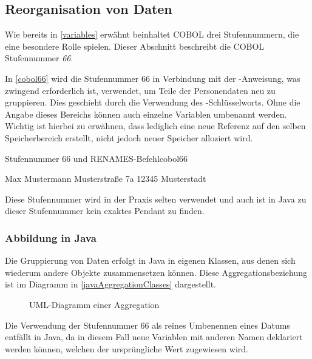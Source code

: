 \subsection{Reorganisation von Daten}
Wie bereits in \autoref{variables} erwähnt beinhaltet COBOL drei Stufennummern, die eine besondere Rolle spielen. Dieser Abschnitt beschreibt die COBOL Stufennummer \textit{66}.

In \autoref{cobol66} wird die Stufennummer 66 in Verbindung mit der -Anweisung, was zwingend erforderlich ist, verwendet, um Teile der Personendaten neu zu gruppieren. Dies geschieht durch die Verwendung des -Schlüsselworts. Ohne die Angabe dieses Bereichs können auch einzelne Variablen umbenannt werden. Wichtig ist hierbei zu erwähnen, dass lediglich eine neue Referenz auf den selben Speicherbereich erstellt, nicht jedoch neuer Speicher alloziert wird.

\begin{codeWithCaption}{Stufennummer 66 und RENAMES-Befehl}{cobol66}
\begin{shellwindow}
Max       Mustermann
Musterstraße  7a   12345 Musterstadt   
\end{shellwindow}
\end{codeWithCaption}

Diese Stufennummer wird in der Praxis selten verwendet und auch ist in Java zu dieser Stufennummer kein exaktes Pendant zu finden. 
\subsubsection*{Abbildung in Java}
Die Gruppierung von Daten erfolgt in Java in eigenen Klassen, aus denen sich wiederum andere Objekte zusammensetzen können. Diese Aggregationsbeziehung ist im Diagramm in \autoref{javaAggregationClasses} dargestellt. 

\begin{figure}[H]
    \centering
    \caption{UML-Diagramm einer Aggregation}
    \label{javaAggregationClasses}
\end{figure}
Die Verwendung der Stufennummer 66 als reines Umbenennen eines Datums entfällt in Java, da in diesem Fall neue Variablen mit anderen Namen deklariert werden können, welchen der ursprüngliche Wert zugewiesen wird.
